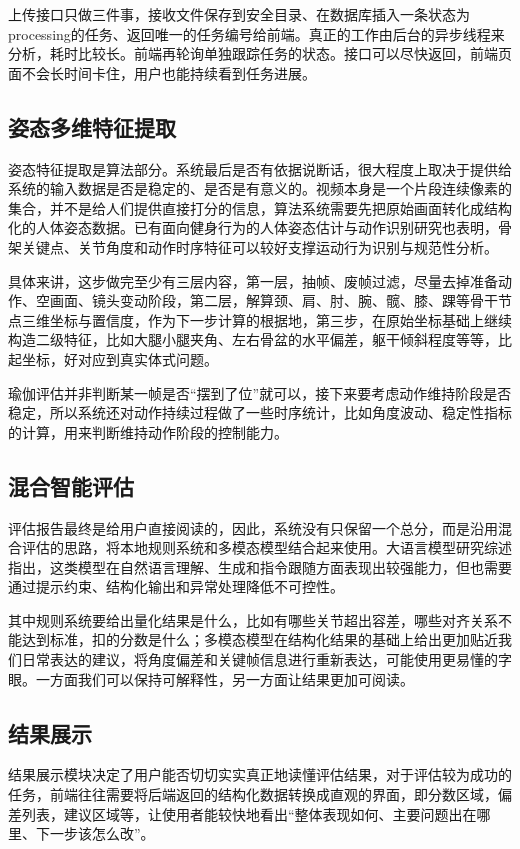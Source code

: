 \documentclass[UTF8,twoside]{ctexrep}
\makeatletter
\def@NAT@last@yr{\@citea}%
\def@NAT@last@yr{-\NAT@penalty}%
\makeatother
\begin{document}
上传接口只做三件事，接收文件保存到安全目录、在数据库插入一条状态为processing的任务、返回唯一的任务编号给前端。真正的工作由后台的异步线程来分析，耗时比较长。前端再轮询单独跟踪任务的状态。接口可以尽快返回，前端页面不会长时间卡住，用户也能持续看到任务进展。

\subsection{姿态多维特征提取}
姿态特征提取是算法部分。系统最后是否有依据说断话，很大程度上取决于提供给系统的输入数据是否是稳定的、是否是有意义的。视频本身是一个片段连续像素的集合，并不是给人们提供直接打分的信息，算法系统需要先把原始画面转化成结构化的人体姿态数据。已有面向健身行为的人体姿态估计与动作识别研究也表明，骨架关键点、关节角度和动作时序特征可以较好支撑运动行为识别与规范性分析\cite{ref_cn_fitness_pose_action}。

具体来讲，这步做完至少有三层内容，第一层，抽帧、废帧过滤，尽量去掉准备动作、空画面、镜头变动阶段，第二层，解算颈、肩、肘、腕、髋、膝、踝等骨干节点三维坐标与置信度，作为下一步计算的根据地，第三步，在原始坐标基础上继续构造二级特征，比如大腿小腿夹角、左右骨盆的水平偏差，躯干倾斜程度等等，比起坐标，好对应到真实体式问题。

瑜伽评估并非判断某一帧是否“摆到了位”就可以，接下来要考虑动作维持阶段是否稳定，所以系统还对动作持续过程做了一些时序统计，比如角度波动、稳定性指标的计算，用来判断维持动作阶段的控制能力。

\subsection{混合智能评估}
评估报告最终是给用户直接阅读的，因此，系统没有只保留一个总分，而是沿用混合评估的思路，将本地规则系统和多模态模型结合起来使用。大语言模型研究综述指出，这类模型在自然语言理解、生成和指令跟随方面表现出较强能力，但也需要通过提示约束、结构化输出和异常处理降低不可控性\cite{ref_cn_llm_survey}。

其中规则系统要给出量化结果是什么，比如有哪些关节超出容差，哪些对齐关系不能达到标准，扣的分数是什么；多模态模型在结构化结果的基础上给出更加贴近我们日常表达的建议，将角度偏差和关键帧信息进行重新表达，可能使用更易懂的字眼。一方面我们可以保持可解释性，另一方面让结果更加可阅读。

\subsection{结果展示}
结果展示模块决定了用户能否切切实实真正地读懂评估结果，对于评估较为成功的任务，前端往往需要将后端返回的结构化数据转换成直观的界面，即分数区域，偏差列表，建议区域等，让使用者能较快地看出“整体表现如何、主要问题出在哪里、下一步该怎么改”。
\end{document}

